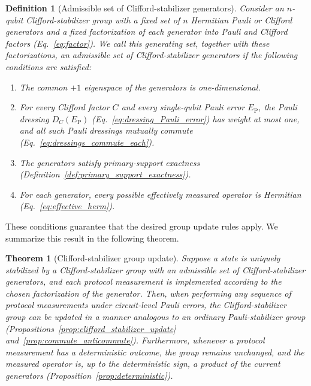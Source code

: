 \documentclass[
 reprint,
 amsmath,amssymb,
 pra,superscriptaddress, nofootinbib
]{revtex4-2}
\newtheorem{definition}{Definition}
\newtheorem{theorem}{Theorem}
\theoremstyle{definition}
\theoremstyle{plain}
\begin{document}
\begin{definition}[Admissible set of Clifford-stabilizer generators]
\label{def:admissible}
Consider an $n$-qubit Clifford-stabilizer group with a fixed set of $n$ Hermitian Pauli or Clifford generators and a fixed factorization of each generator into Pauli and Clifford factors (Eq.~\eqref{eq:factor}). We call this generating set, together with these factorizations, an admissible set of Clifford-stabilizer generators if the following conditions are satisfied:
\begin{enumerate}[leftmargin=*]
\item The common $+1$ eigenspace of the generators is one-dimensional.
\item For every Clifford factor $C$ and every single-qubit Pauli error
$E_{\mathrm P}$, the Pauli dressing $D_C(E_{\mathrm P})$ (Eq.~\eqref{eq:dressing_Pauli_error}) has weight
at most one, and all such Pauli dressings mutually commute (Eq.~\eqref{eq:dressings_commute_each}).
\item The generators satisfy primary-support exactness (Definition~\ref{def:primary_support_exactness}).
\item For each generator, every possible effectively measured operator is Hermitian (Eq.~\eqref{eq:effective_herm}).
\end{enumerate}
\end{definition}

These conditions guarantee that the desired group update rules apply. We summarize this result in the following theorem.

\begin{theorem}[Clifford-stabilizer group update]
\label{theorem:update}
Suppose a state is uniquely stabilized by a Clifford-stabilizer group with an admissible set of Clifford-stabilizer generators, and each protocol measurement is implemented according to the chosen factorization of the generator. Then, when performing any sequence of protocol measurements under circuit-level Pauli errors, the Clifford-stabilizer group can be updated in a manner analogous to an ordinary Pauli-stabilizer group (Propositions~\ref{prop:clifford_stabilizer_update} and~\ref{prop:commute_anticommute}).
Furthermore, whenever a protocol measurement has a deterministic outcome, the group remains unchanged, and the measured operator is, up to the deterministic sign, a product of the current generators (Proposition~\ref{prop:deterministic}).
\end{theorem}
\end{document}
